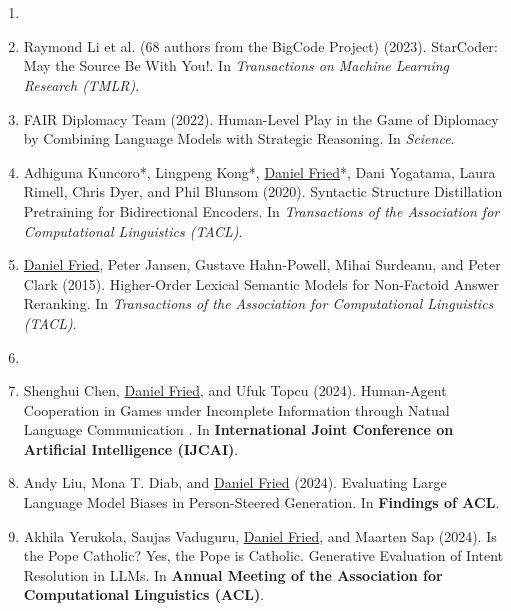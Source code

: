 \section{}

\begin{enumerate}[leftmargin=-1mm,partopsep=0pt]

\item[]

\item Raymond Li et al. (68 authors from the BigCode Project) (2023). {StarCoder}: May the Source Be With You!. In \emph{Transactions on Machine Learning Research (TMLR)}.

\item FAIR Diplomacy Team (2022). Human-Level Play in the Game of {Diplomacy} by Combining Language Models with Strategic Reasoning. In \emph{Science}.

\item Adhiguna Kuncoro*, Lingpeng Kong*, \underline{Daniel Fried}*, Dani Yogatama, Laura Rimell, Chris Dyer, and Phil Blunsom (2020). Syntactic Structure Distillation Pretraining for Bidirectional Encoders. In \emph{Transactions of the Association for Computational Linguistics (TACL)}.

\item \underline{Daniel Fried}, Peter Jansen, Gustave Hahn-Powell, Mihai Surdeanu, and Peter Clark (2015). Higher-Order Lexical Semantic Models for Non-Factoid Answer Reranking. In \emph{Transactions of the Association for Computational Linguistics (TACL)}.

\item[]

\item Shenghui Chen, \underline{Daniel Fried}, and Ufuk Topcu (2024). Human-Agent Cooperation in Games under Incomplete Information through Natual Language Communication . In \textbf{International Joint Conference on Artificial Intelligence (IJCAI)}.

\item Andy Liu, Mona T. Diab, and \underline{Daniel Fried} (2024). Evaluating Large Language Model Biases in Person-Steered Generation. In \textbf{Findings of ACL}.

\item Akhila Yerukola, Saujas Vaduguru, \underline{Daniel Fried}, and Maarten Sap (2024). Is the Pope {Catholic}? Yes, the Pope is {Catholic}. Generative Evaluation of Intent Resolution in LLMs. In \textbf{Annual Meeting of the Association for Computational Linguistics (ACL)}.


\end{enumerate}
